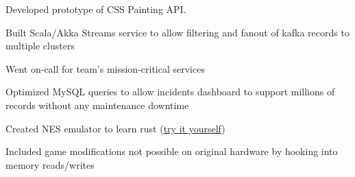 \documentclass[12pt]{jmichaud-resume}
\begin{document}
\begin{minipage}[t]{11.5cm}
\begin{tightemize}
	\item Developed prototype of CSS Painting API.
\end{tightemize}
\sectionsep
{} \hfill {}


\begin{tightemize}
	\item Built Scala/Akka Streams service to allow filtering and fanout of kafka records to multiple clusters
	\item Went on-call for team's mission-critical services
	
\end{tightemize}
\sectionsepp
{}\hfill{}

\begin{tightemize}
	\item Optimized MySQL queries to allow incidents dashboard to support millions of records without any maintenance downtime
\end{tightemize}
\sectionsep



 \hfill {}



 \hfill
{}
\begin{tightemize}
	\item Created NES emulator to learn rust (\href{http://justinmichaud.com}{\underline{try it yourself}})
	\item Included game modifications not possible on original hardware by hooking into memory reads/writes
\end{tightemize}


\end{minipage}
\end{document}
